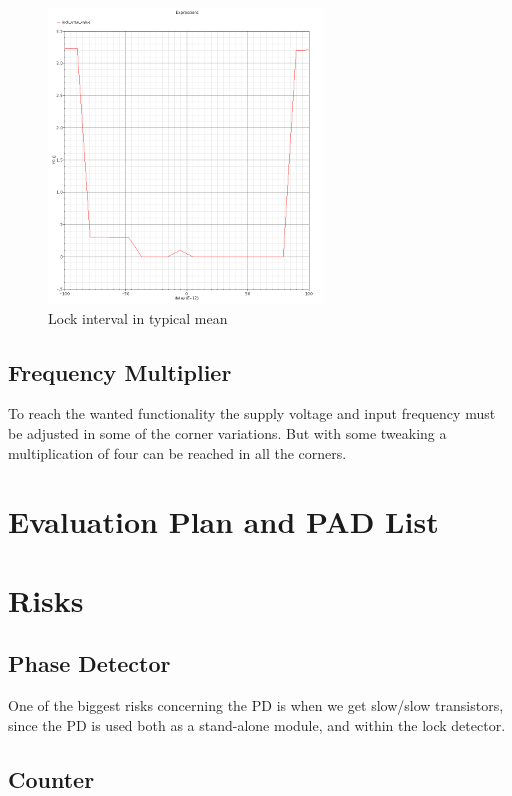 \documentclass[a4paper,12pt]{article} \usepackage{graphicx}
\begin{document}
\begin{figure}[h]
  \centering
  \includegraphics[width=0.65\textwidth]{../Bilder/LD_tran/LD_lsim_tm.png}
  \caption{Lock interval in typical mean}
  \label{fig:LDtm}
\end{figure}

\clearpage

\subsection{Frequency Multiplier}
To reach the wanted functionality the supply voltage and input frequency must be
adjusted in some of the corner variations. But with some tweaking a
multiplication of four can be reached in all the corners.

\section{Evaluation Plan and PAD List}

\section{Risks}
\subsection{Phase Detector}
One of the biggest risks concerning the PD is when we get
slow/slow transistors, since the PD is used both as a stand-alone
module, and within the lock detector.
\subsection{Counter}
\end{document}
